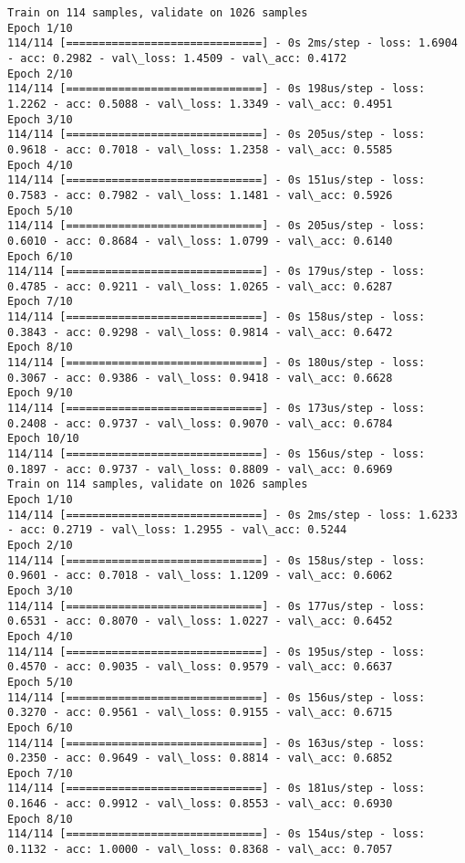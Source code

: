 \documentclass[11pt]{article}
\begin{document}
    \begin{Verbatim}[commandchars=\\\{\}]
Train on 114 samples, validate on 1026 samples
Epoch 1/10
114/114 [==============================] - 0s 2ms/step - loss: 1.6904 - acc: 0.2982 - val\_loss: 1.4509 - val\_acc: 0.4172
Epoch 2/10
114/114 [==============================] - 0s 198us/step - loss: 1.2262 - acc: 0.5088 - val\_loss: 1.3349 - val\_acc: 0.4951
Epoch 3/10
114/114 [==============================] - 0s 205us/step - loss: 0.9618 - acc: 0.7018 - val\_loss: 1.2358 - val\_acc: 0.5585
Epoch 4/10
114/114 [==============================] - 0s 151us/step - loss: 0.7583 - acc: 0.7982 - val\_loss: 1.1481 - val\_acc: 0.5926
Epoch 5/10
114/114 [==============================] - 0s 205us/step - loss: 0.6010 - acc: 0.8684 - val\_loss: 1.0799 - val\_acc: 0.6140
Epoch 6/10
114/114 [==============================] - 0s 179us/step - loss: 0.4785 - acc: 0.9211 - val\_loss: 1.0265 - val\_acc: 0.6287
Epoch 7/10
114/114 [==============================] - 0s 158us/step - loss: 0.3843 - acc: 0.9298 - val\_loss: 0.9814 - val\_acc: 0.6472
Epoch 8/10
114/114 [==============================] - 0s 180us/step - loss: 0.3067 - acc: 0.9386 - val\_loss: 0.9418 - val\_acc: 0.6628
Epoch 9/10
114/114 [==============================] - 0s 173us/step - loss: 0.2408 - acc: 0.9737 - val\_loss: 0.9070 - val\_acc: 0.6784
Epoch 10/10
114/114 [==============================] - 0s 156us/step - loss: 0.1897 - acc: 0.9737 - val\_loss: 0.8809 - val\_acc: 0.6969
Train on 114 samples, validate on 1026 samples
Epoch 1/10
114/114 [==============================] - 0s 2ms/step - loss: 1.6233 - acc: 0.2719 - val\_loss: 1.2955 - val\_acc: 0.5244
Epoch 2/10
114/114 [==============================] - 0s 158us/step - loss: 0.9601 - acc: 0.7018 - val\_loss: 1.1209 - val\_acc: 0.6062
Epoch 3/10
114/114 [==============================] - 0s 177us/step - loss: 0.6531 - acc: 0.8070 - val\_loss: 1.0227 - val\_acc: 0.6452
Epoch 4/10
114/114 [==============================] - 0s 195us/step - loss: 0.4570 - acc: 0.9035 - val\_loss: 0.9579 - val\_acc: 0.6637
Epoch 5/10
114/114 [==============================] - 0s 156us/step - loss: 0.3270 - acc: 0.9561 - val\_loss: 0.9155 - val\_acc: 0.6715
Epoch 6/10
114/114 [==============================] - 0s 163us/step - loss: 0.2350 - acc: 0.9649 - val\_loss: 0.8814 - val\_acc: 0.6852
Epoch 7/10
114/114 [==============================] - 0s 181us/step - loss: 0.1646 - acc: 0.9912 - val\_loss: 0.8553 - val\_acc: 0.6930
Epoch 8/10
114/114 [==============================] - 0s 154us/step - loss: 0.1132 - acc: 1.0000 - val\_loss: 0.8368 - val\_acc: 0.7057

\end{Verbatim}
\end{document}
